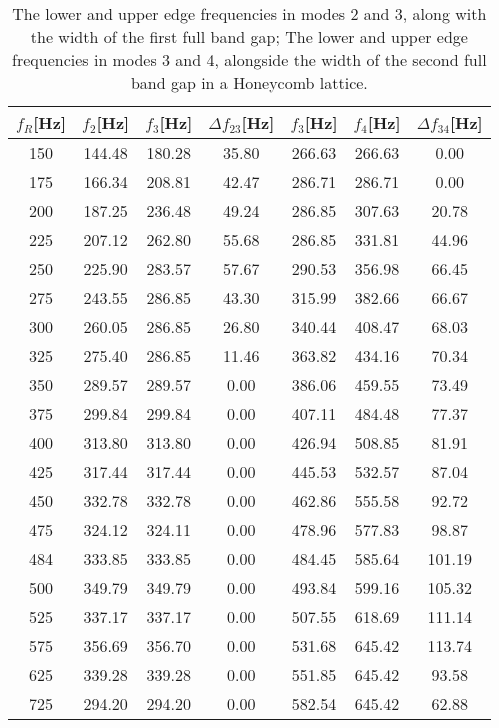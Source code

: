 \documentclass{article}
\begin{document}
\begin{table}[htb]
\centering
\caption{The lower and upper edge frequencies in modes 2 and 3, along with the width of the first full band gap; The lower and upper edge frequencies in modes 3 and 4, alongside the width of the second full band gap in a Honeycomb lattice.}
\label{tab400}
\begin{tabular}{ccccccc}
\hline
$f_R$[Hz] & $f_2$[Hz] & $f_3$[Hz] & $\Delta f _{23}$[Hz] & $f_3$[Hz] & $f_4$[Hz] & $\Delta f _{34}$[Hz] \\ \hline
150 & 144.48 & 180.28 & 35.80 & 266.63 & 266.63 & 0.00 \\ \hline
175 & 166.34 & 208.81 & 42.47 & 286.71 & 286.71 & 0.00 \\ \hline
200 & 187.25 & 236.48 & 49.24 & 286.85 & 307.63 & 20.78 \\ \hline
225 & 207.12 & 262.80 & 55.68 & 286.85 & 331.81 & 44.96 \\ \hline
250 & 225.90 & 283.57 & 57.67 & 290.53 & 356.98 & 66.45 \\ \hline
275 & 243.55 & 286.85 & 43.30 & 315.99 & 382.66 & 66.67 \\ \hline
300 & 260.05 & 286.85 & 26.80 & 340.44 & 408.47 & 68.03 \\ \hline
325 & 275.40 & 286.85 & 11.46 & 363.82 & 434.16 & 70.34 \\ \hline
350 & 289.57 & 289.57 & 0.00 & 386.06 & 459.55 & 73.49 \\ \hline
375 & 299.84 & 299.84 & 0.00 & 407.11 & 484.48 & 77.37 \\ \hline
400 & 313.80 & 313.80 & 0.00 & 426.94 & 508.85 & 81.91 \\ \hline
425 & 317.44 & 317.44 & 0.00 & 445.53 & 532.57 & 87.04 \\ \hline
450 & 332.78 & 332.78 & 0.00 & 462.86 & 555.58 & 92.72 \\ \hline
475 & 324.12 & 324.11 & 0.00 & 478.96 & 577.83 & 98.87 \\ \hline
484 & 333.85 & 333.85 & 0.00 & 484.45 & 585.64 & 101.19 \\ \hline
500 & 349.79 & 349.79 & 0.00 & 493.84 & 599.16 & 105.32 \\ \hline
525 & 337.17 & 337.17 & 0.00 & 507.55 & 618.69 & 111.14 \\ \hline
575 & 356.69 & 356.70 & 0.00 & 531.68 & 645.42 & 113.74 \\ \hline
625 & 339.28 & 339.28 & 0.00 & 551.85 & 645.42 & 93.58 \\ \hline
725 & 294.20 & 294.20 & 0.00 & 582.54 & 645.42 & 62.88 \\ \hline
\end{tabular}
\end{table}
\end{document}
